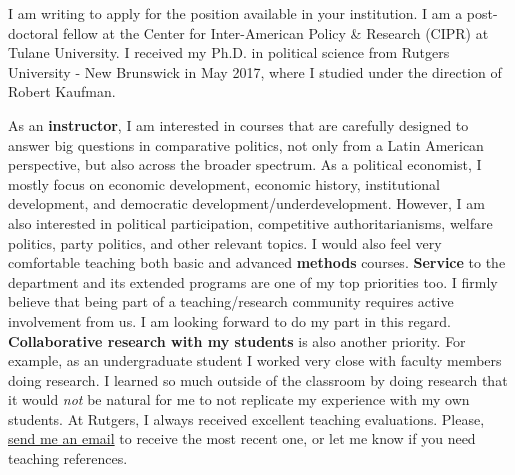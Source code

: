 \documentclass[10pt,stdletter,dateno,sigleft]{newlfm} %
\begin{document}
\begin{newlfm}


\vspace{-0.3cm}I am writing to apply for the position available in your institution. I am a post-doctoral fellow at the Center for Inter-American Policy \& Research (CIPR) at Tulane University. I received my Ph.D. in political science from Rutgers University - New Brunswick in May 2017, where I studied under the direction of Robert Kaufman.


As an {\bf instructor}, I am interested in courses that are carefully designed to answer big questions in comparative politics, not only from a Latin American perspective, but also across the broader spectrum. As a political economist, I mostly focus on economic development, economic history, institutional development, and democratic development/underdevelopment. However, I am also interested in political participation, competitive authoritarianisms, welfare politics, party politics, and other relevant topics. I would also feel very comfortable teaching both basic and advanced {\bf methods} courses. {\bf Service} to the department and its extended programs are one of my top priorities too. I firmly believe that being part of a teaching/research community requires active involvement from us. I am looking forward to do my part in this regard. {\bf Collaborative research with my students} is also another priority. For example, as an undergraduate student I worked very close with faculty members doing research. I learned so much outside of the classroom by doing research that it would \emph{not} be natural for me to not replicate my experience with my own students. At Rutgers, I always received excellent teaching evaluations. Please, \href{mailto:\filetext}{send me an email} to receive the most recent one, or let me know if you need teaching references.



\end{newlfm}
\end{document}
